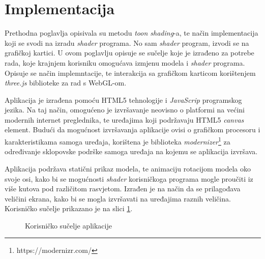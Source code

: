 \section{Implementacija}

Prethodna poglavlja opisivala su metodu \emph{toon shading}-a, te način implementacija koji se svodi na izradu \emph{shader} programa. No sam \emph{shader} program, izvodi se na grafičkoj kartici. U ovom poglavlju opisuje se sučelje koje je izrađeno za potrebe rada, koje krajnjem korisniku omogućava izmjenu modela i \emph{shader} programa. Opisuje se način implemntacije, te interakcija sa grafičkom karticom korištenjem \emph{three.js} biblioteke za rad s WebGL-om.

Aplikacija je izrađena pomoću HTML5 tehnologije i \emph{JavaScrip} programskog jezika. Na taj način, omogućeno je izvršavanje neovisno o platformi na većini modernih internet preglednika, te uređajima koji podržavaju HTML5 \emph{canvas} element. Budući da mogućnost izvršavanja aplikacije ovisi o grafičkom procesoru i karakteristikama samoga uređaja, korištena je biblioteka \emph{modernizer}\footnote{https://modernizr.com/} za određivanje sklopovske podrške samoga uređaja na kojemu se aplikacija izvršava.

Aplikacija podržava statični prikaz modela, te animaciju rotacijom modela oko svoje osi, kako bi se mogućnosti \emph{shader} korisničkoga programa mogle proučiti iz više kutova pod različitom rasvjetom. Izrađen je na način da se prilagođava veličini ekrana, kako bi se mogla izvršavati na uređajima raznih veličina. Korisničko sučelje prikazano je na slici \ref{fig:interface}.

\begin{figure}[H]
\centering{}
\caption{Korisničko sučelje aplikacije}
\label{fig:interface}
\end{figure}

